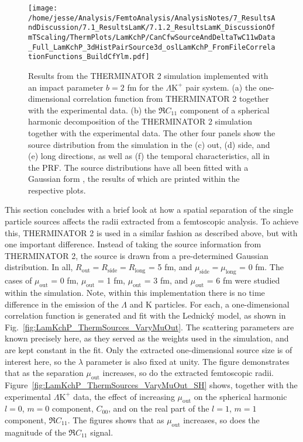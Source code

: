 \documentclass[ALICE,manyauthors]{cernphprep}
\newcommand{\Lam}{$\Lambda$\xspace}
\newcommand{\LamKchP}{$\Lambda\mathrm{K^{+}}$\xspace}
\providecommand{\DIFaddtex}[1]{{\protect\color{blue}\uwave{#1}}} %
\providecommand{\DIFaddFL}[1]{\DIFadd{#1}} %
\providecommand{\DIFaddbeginFL}{} %
\providecommand{\DIFaddendFL}{} %
\providecommand{\DIFadd}[1]{\texorpdfstring{\DIFaddtex{#1}}{#1}} %
\begin{document}
\begin{figure}[h!]
  \centering
  \texttt{[image: /home/jesse/Analysis/FemtoAnalysis/AnalysisNotes/7\_ResultsAndDiscussion/7.1\_ResultsLamK/7.1.2\_ResultsLamK\_DiscussionOfmTScaling/ThermPlots/LamKchP/CanCfwSourceAndDeltaTwC11wData\_Full\_LamKchP\_3dHistPairSource3d\_oslLamKchP\_FromFileCorrelationFunctions\_BuildCfYlm.pdf]}
  \caption[THERMINATOR 2 simulatin for \LamKchP]
  {
  Results from the THERMINATOR 2 simulation implemented with an impact parameter $b = 2$ fm for the \LamKchP pair system.
  (a) the one-dimensional correlation function from THERMINATOR 2 together with the experimental data.
  (b) the $\Re C_{11}$ component of a spherical harmonic decomposition of the THERMINATOR 2 simulation together with the experimental data.
  The other four panels show the source distribution from the simulation in the (c) out, (d) side, and (e) long directions, as well as (f) the temporal characteristics, all in the PRF.
  The source distributions have all been fitted with a Gaussian form \DIFaddbeginFL \DIFaddFL{over the regions contained within the dashed lines}\DIFaddendFL , the results of which are printed within the respective plots.
  }
  \label{fig:LamKchP_StdThermSources}
\end{figure}



This section concludes with a brief look at how a spatial separation of the single particle sources affects the radii extracted from a femtoscopic analysis.
To achieve this, THERMINATOR 2 is used in a similar fashion as described above, but with one important difference.
Instead of taking the source information from THERMINATOR 2, the source is drawn from a pre-determined Gaussian distribution.
In all, $R_{\mathrm{out}} = R_{\mathrm{side}} = R_{\mathrm{long}}$ = 5 fm, and $\mu_{\mathrm{side}} = \mu_{\mathrm{long}}$ = 0 fm.
The cases of $\mu_{\mathrm{out}}$ = 0 fm, $\mu_{\mathrm{out}}$ = 1 fm, $\mu_{\mathrm{out}}$ = 3 fm, and $\mu_{\mathrm{out}}$ = 6 fm were studied within the simulation.
Note, within this implementation there is no time difference in the emission of the \Lam and K particles.
For each, a one-dimensional correlation function is generated and fit with the Lednick\'y model, as shown in Fig.~\ref{fig:LamKchP_ThermSources_VaryMuOut}.
The scattering parameters are known precisely here, as they served as the weights used in the simulation, and are kept constant in the fit.
Only the extracted one-dimensional source size is of interest here, so the $\lambda$ parameter is also fixed at unity.
The figure demonstrates that as the separation $\mu_{\mathrm{out}}$ increases, so do the extracted femtoscopic radii.
Figure~\ref{fig:LamKchP_ThermSources_VaryMuOut_SH} shows, together with the experimental \LamKchP data, the effect of increasing $\mu_{\mathrm{out}}$ on the spherical harmonic $l=0$, $m=0$ component, $C_{00}$, and on the real part of the $l=1$, $m=1$ component, $\Re C_{11}$.
The figures shows that as $\mu_{\mathrm{out}}$ increases, so does the magnitude of the $\Re C_{11}$ signal.
\end{document}

